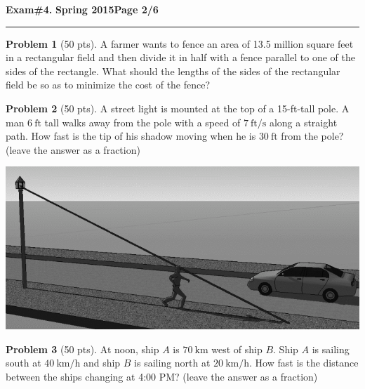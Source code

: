 \documentclass[12pt]{article}
\theoremstyle{definition}
\newtheorem{problem}{Problem}
\begin{document}
\hfill{\large\bf Exam\#4.}\hfill{\large\bf
  Spring 2015}\hfill{\large\bf Page 2/6}\hrule

\bigskip

\begin{problem}[50 pts] 
\large A farmer wants to fence an area of 13.5 million square feet in a rectangular field and then divide it in half with a fence parallel to one of the sides of the rectangle. What should the lengths of the sides of the rectangular field be so as to minimize the cost of the fence?
\end{problem}

\begin{problem}[50 pts] 
\large A street light is mounted at the top of a 15-ft-tall pole.  A man $6~\text{ft}$ tall walks away from the pole with a speed of $7~\text{ft}/\text{s}$ along a straight path.  How fast is the tip of his shadow moving when he is $30~\text{ft}$ from the pole? (leave the answer as a fraction)

\begin{center}
  \includegraphics[width=0.5\linewidth]{casey1.png}
\end{center}
\end{problem}

\begin{problem}[50 pts] 
\large At noon, ship $A$ is $70~\text{km}$ west of ship $B$.  Ship $A$ is sailing south at $40~\text{km}/\text{h}$ and ship $B$ is sailing north at $20~\text{km}/\text{h}$.  How fast is the distance between the ships changing at 4:00 PM? (leave the answer as a fraction)
\end{problem}
 
\end{document}
